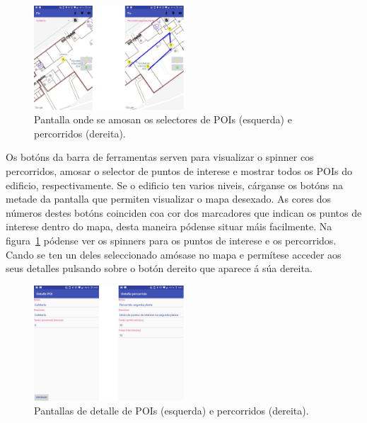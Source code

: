 \begin{figure}[h]
	\begin{center}
		\includegraphics[width=0.5\textwidth]{figures/android/mapaSelector}
		\caption{Pantalla onde se amosan os selectores de POIs (esquerda) e percorridos (dereita).}
		\label{fig:mapaSelector}
	\end{center}
\end{figure}

Os botóns da barra de ferramentas serven para visualizar o spinner cos percorridos, amosar o selector de puntos de interese e mostrar todos os POIs do edificio, respectivamente. Se o edificio ten varios niveis, cárganse os botóns na metade da pantalla que permiten visualizar o mapa desexado. As cores dos números destes botóns coinciden coa cor dos marcadores que indican os puntos de interese dentro do mapa, desta maneira pódense situar máis facilmente. Na figura~\ref{fig:mapaSelector} pódense ver os spinners para os puntos de interese e os percorridos. Cando se ten un deles seleccionado amósase no mapa e permítese acceder aos seus detalles pulsando sobre o botón dereito que aparece á súa dereita.

\begin{figure}[h]
	\begin{center}
		\includegraphics[width=0.5\textwidth]{figures/android/detallePoiPercorrido}
		\caption{Pantallas de detalle de POIs (esquerda) e percorridos (dereita).}
		\label{fig:detallePoiPercorrido}
	\end{center}
\end{figure}

